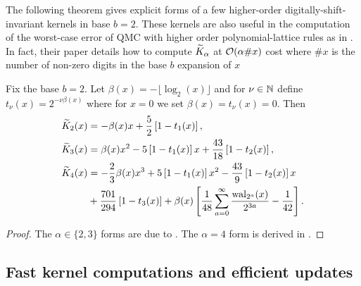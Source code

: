 \documentclass[acmsmall]{acmart}
\begin{document}
The following theorem gives explicit forms of a few higher-order digitally-shift-invariant kernels in base $b=2$. These kernels are also useful in the computation of the worst-case error of QMC with higher order polynomial-lattice rules as in \citep{baldeaux.polylat_efficient_comp_worse_case_error_cbc}. In fact, their paper details how to compute ${\widetilde{K}}_\alpha$ at ${\mathcal{O}}(\alpha \#x)$ cost where $\#x$ is the number of non-zero digits in the base $b$ expansion of $x$
\begin{theorem} \label{thm:explicit_DSI_low_order_forms}
    Fix the base $b=2$. Let $\beta(x) = - \lfloor \log_2(x) \rfloor$ and for $\nu \in {\mathbb{N}}$ define $t_\nu(x) = 2^{-\nu \beta(x)}$ where for $x=0$ we set $\beta(x) = t_\nu(x) = 0$. Then 
    \begin{align*}
        {\widetilde{K}}_2(x) &= -\beta(x) x + \frac{5}{2}\left[1-t_1(x)\right], \\
        {\widetilde{K}}_3(x) &= \beta(x)x^2-5\left[1-t_1(x)\right]x+\frac{43}{18}\left[1-t_2(x)\right], \\
        {\widetilde{K}}_4(x) &= - \frac{2}{3}\beta(x)x^3+5\left[1-t_1(x)\right]x^2 - \frac{43}{9}\left[1-t_2(x)\right]x \\
        &+\frac{701}{294}\left[1-t_3(x)\right]+\beta(x)\left[\frac{1}{48}\sum_{a=0}^\infty \frac{\mathrm{wal}_{2^a}(x)}{2^{3a}} - \frac{1}{42}\right].
    \end{align*}
\end{theorem}
\begin{proof}
    The $\alpha \in \{2,3\}$ forms are due to \citep{baldeaux.polylat_efficient_comp_worse_case_error_cbc}. The $\alpha=4$ form is derived in . 
\end{proof}


\subsection{Fast kernel computations and efficient updates} 
\end{document}
